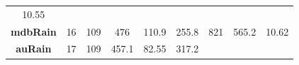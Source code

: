 \documentclass[]{article}
\theoremstyle{definition}
\theoremstyle{definition}
\theoremstyle{definition}
\theoremstyle{remark}
\begin{document}
\begin{longtable}[]{@{}ccccccccc@{}}
\begin{minipage}[t]{0.08\columnwidth}
10.55\strut
\end{minipage}\tabularnewline
\begin{minipage}[t]{0.14\columnwidth}\centering\strut
\textbf{mdbRain}\strut
\end{minipage} & \begin{minipage}[t]{0.06\columnwidth}\centering\strut
16\strut
\end{minipage} & \begin{minipage}[t]{0.05\columnwidth}\centering\strut
109\strut
\end{minipage} & \begin{minipage}[t]{0.11\columnwidth}\centering\strut
476\strut
\end{minipage} & \begin{minipage}[t]{0.08\columnwidth}\centering\strut
110.9\strut
\end{minipage} & \begin{minipage}[t]{0.08\columnwidth}\centering\strut
255.8\strut
\end{minipage} & \begin{minipage}[t]{0.07\columnwidth}\centering\strut
821\strut
\end{minipage} & \begin{minipage}[t]{0.07\columnwidth}\centering\strut
565.2\strut
\end{minipage} & \begin{minipage}[t]{0.08\columnwidth}\centering\strut
10.62\strut
\end{minipage}\tabularnewline
\begin{minipage}[t]{0.14\columnwidth}\centering\strut
\textbf{auRain}\strut
\end{minipage} & \begin{minipage}[t]{0.06\columnwidth}\centering\strut
17\strut
\end{minipage} & \begin{minipage}[t]{0.05\columnwidth}\centering\strut
109\strut
\end{minipage} & \begin{minipage}[t]{0.11\columnwidth}\centering\strut
457.1\strut
\end{minipage} & \begin{minipage}[t]{0.08\columnwidth}\centering\strut
82.55\strut
\end{minipage} & \begin{minipage}[t]{0.08\columnwidth}\centering\strut
317.2\strut
\end{minipage} & \begin{minipage}[t]{0.07\columnwidth}\centering\strut

\end{minipage}
\end{longtable}
\end{document}
